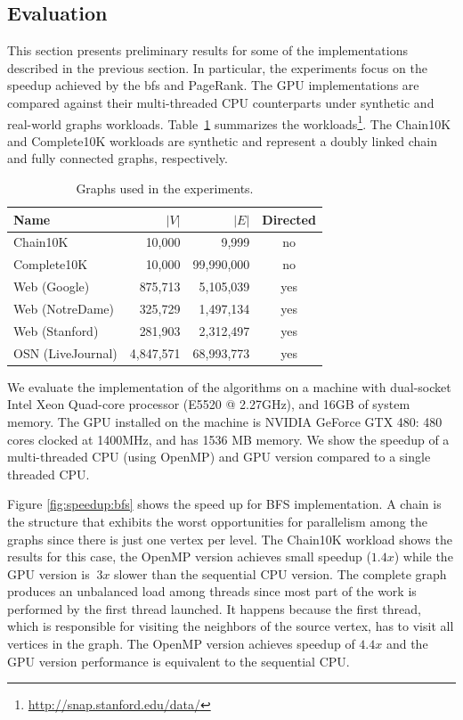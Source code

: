 \subsection{Evaluation}
\label{sec:evaluation}

This section presents preliminary results for some of the implementations described in the previous section. In particular, the experiments focus on the speedup achieved by the {\sc bfs} and PageRank. The GPU implementations are compared against their multi-threaded CPU counterparts under synthetic and real-world graphs workloads. Table~\ref{tab:workload} summarizes the workloads\footnote{\url{http://snap.stanford.edu/data/}}. The Chain10K and Complete10K workloads are synthetic and represent a doubly linked chain and fully connected graphs, respectively.


\begin{table}[ht]
\centering
\begin{tabular}{l|r|r|c}
Name              & $|V|$   & $|E|$      & Directed \\\hline
Chain10K             & 10,000  & 9,999      & no       \\\hline
Complete10K          & 10,000  & 99,990,000 & no       \\\hline
Web (Google)      & 875,713 & 5,105,039  & yes      \\\hline
Web (NotreDame)   & 325,729 & 1,497,134  & yes      \\\hline
Web (Stanford)    & 281,903 & 2,312,497  & yes      \\\hline
OSN (LiveJournal) & 4,847,571 & 68,993,773 & yes    \\\hline
\end{tabular}
\caption{Graphs used in the experiments.}
\label{tab:workload}
\end{table}

We evaluate the implementation of the algorithms on a machine with dual-socket Intel Xeon Quad-core processor (E5520 @ 2.27GHz), and 16GB of system memory. The GPU installed on the machine is NVIDIA GeForce GTX 480: 480 cores clocked at 1400MHz, and has 1536 MB memory. We show the speedup of a multi-threaded CPU (using OpenMP) and GPU version compared to a single threaded CPU.

Figure \ref{fig:speedup:bfs} shows the speed up for BFS implementation. A chain is the structure that exhibits the worst opportunities for parallelism among the graphs since there is just one vertex per level. The Chain10K workload shows the results for this case, the OpenMP version achieves small speedup ($1.4x$) while the GPU version is $~3x$ slower than the sequential CPU version. The complete graph produces an unbalanced load among threads since most part of the work is performed by the first thread launched. It happens because the first thread, which is responsible for visiting the neighbors of the source vertex, has to visit all vertices in the graph. The OpenMP version achieves speedup of $4.4x$ and the GPU version performance is equivalent to the sequential CPU.

